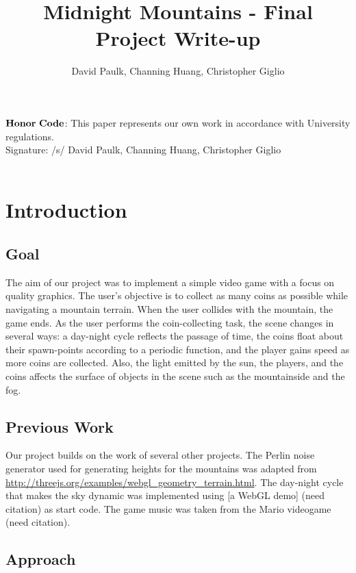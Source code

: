 \documentclass{article}
\begin{document}
\title{Midnight Mountains - Final Project Write-up}
\author{David Paulk, Channing Huang, Christopher Giglio\\}
\date{}
\maketitle

\thispagestyle{empty}

\noindent 
$\bf{Honor \ Code}$: This paper represents our own work in accordance with University regulations.\\
Signature: /s/ David Paulk, Channing Huang, Christopher Giglio
\\ \\
\section{Introduction}
\subsection{Goal}
The aim of our project was to implement a simple video game with a focus on quality graphics.  The user's objective is to collect as many coins as possible while navigating a mountain terrain.  When the user collides with the mountain, the game ends.  As the user performs the coin-collecting task, the scene changes in several ways: a day-night cycle reflects the passage of time, the coins float about their spawn-points according to a periodic function, and the player gains speed as more coins are collected.  Also, the light emitted by the sun, the players, and the coins affects the surface of objects in the scene such as the mountainside and the fog.

\subsection{Previous Work}
Our project builds on the work of several other projects.  The Perlin noise generator used for generating heights for the mountains was adapted from \url{http://threejs.org/examples/webgl_geometry_terrain.html}.  The day-night cycle that makes the sky dynamic was implemented using [a WebGL demo] (need citation) as start code. The game music was taken from the Mario videogame (need citation).
 
\subsection{Approach}
\end{document}

